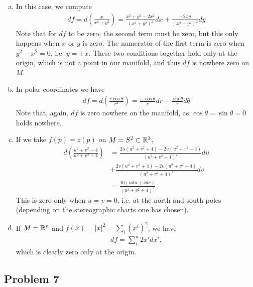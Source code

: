 \documentclass{../../mathnotes}
\begin{document}
\begin{enumerate}[(a)]
    \item
        In this case, we compute
        \begin{align*}
            df=d\left( \frac{x}{x^2+y^2} \right)=\frac{x^2+y^2-2x^2}{(x^2+y^2)^2}dx+\frac{-2xy}{(x^2+y^2)^2}dy
        \end{align*}
        Note that for $df$ to be zero, the second term must be zero, but this only happens when $x$ or $y$ is zero.
        The numerator of the first term is zero when $y^2-x^2=0$, i.e. $y=\pm x$. These two conditions together hold
        only at the origin, which is not a point in our manifold, and thus $df$ is nowhere zero on $M$.
    \item In polar coordinates we have
        \begin{align*}
            df=d\left( \frac{r\cos\theta}{r^2} \right)=\frac{-\cos\theta}{r}dr-\frac{\sin\theta}{r}d\theta
        \end{align*}
        Note that, again, $df$ is zero nowhere on the manifold, as $\cos\theta=\sin\theta=0$ holds nowhere.
    \item If we take $f(p)=z(p)$ on $M=S^2\subset\mathbb{R}^3$,
        \begin{align*}
            d\left(\frac{u^2+v^2-4}{u^2+v^2+4}\right)&=\frac{2u(u^2+v^2+4)-2u(u^2+v^2-4)}{(u^2+v^2+4)^2}du\\
            &+\frac{2v(u^2+v^2+4)-2v(u^2+v^2-4)}{(u^2+v^2+4)^2}dv\\
            &=\frac{16(udu+vdv)}{(u^2+v^2+4)^2}
        \end{align*}
        This is zero only when $u=v=0$, i.e. at the north and south poles (depending on the stereographic charts one has chosen).
    \item If $M=\mathbb{R}^n$ and $f(x)=|x|^2=\sum_i (x^i)^2$, we have
        \begin{align*}
            df=\sum_i^n2x^i dx^i,
        \end{align*}
        which is clearly zero only at the origin.
\end{enumerate}

\subsection*{Problem 7}
\end{document}
